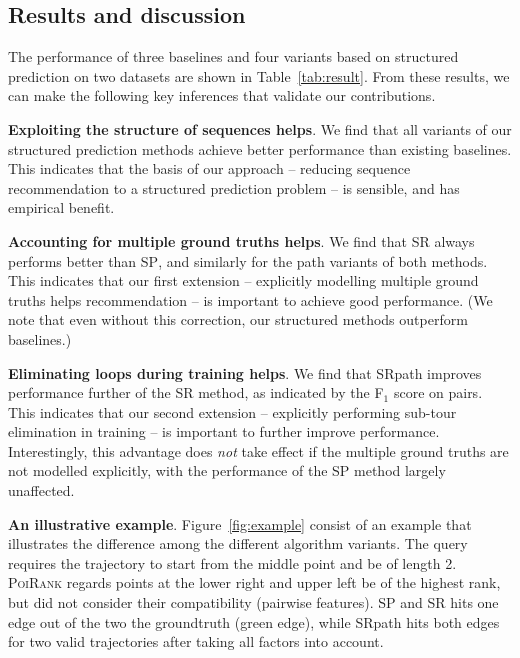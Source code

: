 \secmoveup
\subsection{Results and discussion}
\label{sec:result}
\textmoveup



The performance of three baselines and four variants based on structured prediction on two datasets are shown in Table~\ref{tab:result}.
From these results, we can make the following key inferences that validate our contributions.

\textbf{Exploiting the structure of sequences helps}.
We find that all variants of our structured prediction methods achieve better performance than existing baselines.
This indicates that the basis of our approach -- reducing sequence recommendation to a structured prediction problem -- is sensible, and has empirical benefit.

\textbf{Accounting for multiple ground truths helps}.
We find that \textsc{SR} always performs better than \textsc{SP},
and similarly for the {\sc path} variants of both methods. 
This indicates that our first extension -- explicitly modelling multiple ground truths helps recommendation -- is important to achieve good performance.
(We note that even without this correction, our structured methods outperform baselines.)

\textbf{Eliminating loops during training helps}.
We find that {\sc SRpath} improves performance further of the {\sc SR} method,
as indicated by the F$_1$ score on pairs.
This indicates that our second extension -- explicitly performing sub-tour elimination in training -- is important to further improve performance.
Interestingly,
this advantage does \emph{not} take effect if the multiple ground truths are not modelled explicitly,
with the performance of the {\sc SP} method largely unaffected.

\textbf{An illustrative example}. Figure~\ref{fig:example} consist of an example that illustrates the difference among the different algorithm variants. The query requires the trajectory to start from the middle point and be of length 2. 
\textsc{PoiRank} regards points at the lower right and upper left be of the highest rank, but did not consider their compatibility (\ie pairwise features). {\sc SP} and {\sc SR} hits one edge out of the two the groundtruth (green edge), while {\sc SRpath} hits both edges for two valid trajectories after taking all factors into account. 


